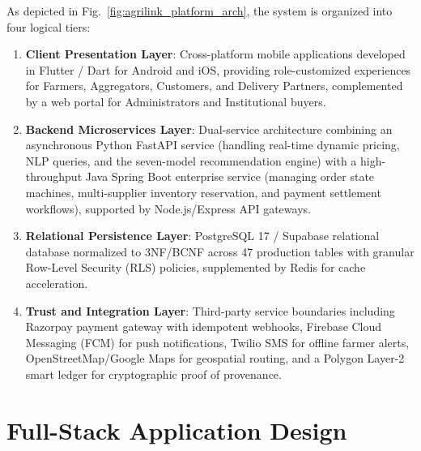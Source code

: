 As depicted in Fig.~\ref{fig:agrilink_platform_arch}, the system is organized into four logical tiers:
\begin{enumerate}
    \item \textbf{Client Presentation Layer}: Cross-platform mobile applications developed in Flutter / Dart for Android and iOS, providing role-customized experiences for Farmers, Aggregators, Customers, and Delivery Partners, complemented by a web portal for Administrators and Institutional buyers.
    \item \textbf{Backend Microservices Layer}: Dual-service architecture combining an asynchronous Python FastAPI service (handling real-time dynamic pricing, NLP queries, and the seven-model recommendation engine) with a high-throughput Java Spring Boot enterprise service (managing order state machines, multi-supplier inventory reservation, and payment settlement workflows), supported by Node.js/Express API gateways.
    \item \textbf{Relational Persistence Layer}: PostgreSQL 17 / Supabase relational database normalized to 3NF/BCNF across 47 production tables with granular Row-Level Security (RLS) policies, supplemented by Redis for cache acceleration.
    \item \textbf{Trust and Integration Layer}: Third-party service boundaries including Razorpay payment gateway with idempotent webhooks, Firebase Cloud Messaging (FCM) for push notifications, Twilio SMS for offline farmer alerts, OpenStreetMap/Google Maps for geospatial routing, and a Polygon Layer-2 smart ledger for cryptographic proof of provenance.
\end{enumerate}

\section{Full-Stack Application Design}
\label{sec:fullstack_design}

